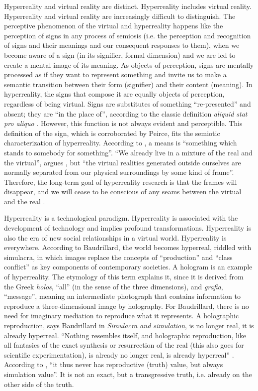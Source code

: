 \documentclass[english]{textolivre}
\begin{document}
Hyperreality and virtual reality are distinct. Hyperreality includes virtual reality. Hyperreality and virtual reality are increasingly difficult to distinguish. The perceptive phenomenon of the virtual and hyperreality happens like the perception of signs in any process of semiosis (i.e. the perception and recognition of signs and their meanings and our consequent responses to them), when we become aware of a sign (in its signifier, formal dimension) and we are led to create a mental image of its meaning. As objects of perception, signs are mentally processed as if they want to represent something and invite us to make a semantic transition between their form (signifier) and their content (meaning). In hyperreality, the signs that compose it are equally objects of perception, regardless of being virtual. Signs are substitutes of something “re-presented” and absent; they are “in the place of”, according to the classic definition \textit{aliquid stat pro aliquo} \cite[p.~14]{eco_semiotics_1986}. However, this function is not always evident and perceptible. This definition of the sign, which is corroborated by Peirce, fits the semiotic characterization of hyperreality. According to \textcite[§ 2228]{peirce_collected_1978}, a means is “something which stands to somebody for something”. “We already live in a mixture of the real and the virtual”, argues \textcite[p.~32]{tiffin_hyperreality_2005}, but “the virtual realities generated outside ourselves are normally separated from our physical surroundings by some kind of frame”. Therefore, the long-term goal of hyperreality research is that the frames will disappear, and we will cease to be conscious of any seams between the virtual and the real \cite[p.~32]{tiffin_hyperreality_2005}.

Hyperreality is a technological paradigm. Hyperreality is associated with the development of technology and implies profound transformations. Hyperreality is also the era of new social relationships in a virtual world. Hyperreality is everywhere. According to Baudrillard, the world becomes hyperreal, riddled with simulacra, in which images replace the concepts of “production” and “class conflict” as key components of contemporary societies. A hologram is an example of hyperreality. The etymology of this term explains it, since it is derived from the Greek \textit{holos}, “all” (in the sense of the three dimensions), and \textit{grafia}, “message”, meaning an intermediate photograph that contains information to reproduce a three-dimensional image by holography. For Baudrillard, there is no need for imaginary mediation to reproduce what it represents. A holographic reproduction, says Baudrillard in \textit{Simulacra and simulation}, is no longer real, it is already hyperreal. “Nothing resembles itself, and holographic reproduction, like all fantasies of the exact synthesis or resurrection of the real (this also goes for scientific experimentation), is already no longer real, is already hyperreal” \cite[p.~109]{baudrillard_simulacra_1997}. According to \textcite[p.~109]{baudrillard_simulacra_1997}, “it thus never has reproductive (truth) value, but always simulation value”. It is not an exact, but a transgressive truth, i.e. already on the other side of the truth.
\end{document}
